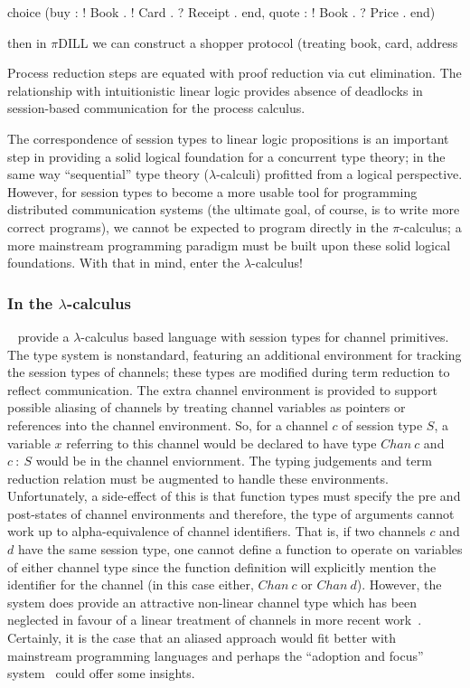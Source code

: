 \documentclass{mprop}
\newcommand{\1}{\textbf{1}\xspace}
\begin{document}
choice (buy : ! Book . ! Card . ? Receipt . end, quote : ! Book . ? Price . end)

then in $\pi$DILL we can construct a shopper protocol (treating book, card, address

Process reduction steps are equated with proof reduction via cut elimination. The relationship with intuitionistic linear logic provides absence of deadlocks in session-based communication for the process calculus.

The correspondence of session types to linear logic propositions is an important step in providing a solid logical foundation for a concurrent type theory; in the same way ``sequential'' type theory ($\lambda$-calculi) profitted from a logical perspective. However, for session types to become a more usable tool for programming distributed communication systems (the ultimate goal, of course, is to write more correct programs), we cannot be expected to program directly in the $\pi$-calculus; a more mainstream programming paradigm must be built upon these solid logical foundations. With that in mind, enter the $\lambda$-calculus!

\subsubsection{In the \texorpdfstring{$\lambda$}{lambda}-calculus}
\label{sec:lam}

\citeauthor{Gay:2008:STI}~\cite{Gay:2008:STI} provide a $\lambda$-calculus based language with session types for channel primitives. The type system is nonstandard, featuring an additional environment for tracking the session types of channels; these types are modified during term reduction to reflect communication. The extra channel environment is provided to support possible aliasing of channels by treating channel variables as pointers or references into the channel environment. So, for a channel $c$ of session type $S$, a variable $x$ referring to this channel would be declared to have type $Chan~c$ and $c~:~S$ would be in the channel enviornment. The typing judgements and term reduction relation must be augmented to handle these environments. Unfortunately, a side-effect of this is that function types must specify the pre and post-states of channel environments and therefore, the type of arguments cannot work up to alpha-equivalence of channel identifiers. That is, if two channels $c$ and $d$ have the same session type, one cannot define a function to operate on variables of either channel type since the function definition will explicitly mention the identifier for the channel (in this case either, $Chan~c$ or $Chan~d$). However, the system does provide an attractive non-linear channel type which has been neglected in favour of a linear treatment of channels in more recent work~\cite{Gay:2010:LAST,Mazurak:2010:LCC,Wadler:2012}. Certainly, it is the case that an aliased approach would fit better with mainstream programming languages and perhaps the ``adoption and focus'' system~\cite{Fahndrich:2002} could offer some insights.
\end{document}
